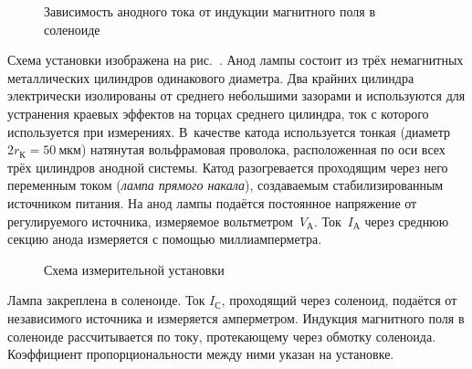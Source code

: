 \begin{figure}[h]
    \centering
    \caption{Зависимость анодного тока от индукции магнитного поля в соленоиде}
\end{figure}

Схема установки изображена на рис.~. 
Анод лампы состоит из трёх немагнитных металлических 
цилиндров одинакового диаметра.
Два крайних цилиндра электрически изолированы от среднего небольшими зазорами и
используются для устранения краевых эффектов на торцах среднего цилиндра, ток с
которого используется при измерениях. В~качестве катода используется тонкая
(диаметр $2r_{К}=50~\text{мкм}$) натянутая вольфрамовая проволока, расположенная по оси
всех трёх цилиндров анодной системы. Катод разогревается проходящим 
через него переменным током (\emph{лампа прямого накала}),
создаваемым стабилизированным источником питания. 
На анод лампы подаётся постоянное напряжение от регулируемого источника, 
измеряемое вольтметром~$V_{А}$. Ток~$I_{А}$ через среднюю секцию анода  
измеряется с помощью миллиамперметра.

\begin{figure}[h]
    \centering
	\caption{Схема измерительной установки}
\end{figure}

Лампа закреплена в соленоиде. Ток $I_{С}$, проходящий через соленоид, подаётся от
независимого источника и измеряется амперметром. Индукция магнитного поля в
соленоиде рассчитывается по току, протекающему через обмотку соленоида.
Коэффициент пропорциональности между ними указан на установке.


